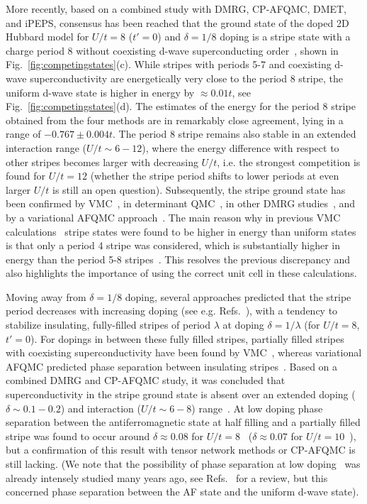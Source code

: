 \documentclass{ar-1col}
\begin{document}
More recently, based on a combined study with DMRG, CP-AFQMC, DMET, and iPEPS, consensus has been reached that the ground state of the doped 2D Hubbard model for $U/t=8$ ($t'=0$) and  $\delta=1/8$ doping is a stripe state with a charge period 8 without coexisting d-wave superconducting order~\cite{Zheng17}, shown in Fig.~\ref{fig:competingstates}(c). While stripes with periods 5-7 and coexisting d-wave superconductivity are energetically very close to the period 8 stripe, the uniform d-wave state is  higher in energy by $\approx 0.01t$, see Fig.~\ref{fig:competingstates}(d). The estimates of the energy for the period 8 stripe obtained from the four methods are in remarkably close agreement, lying in a range of $-0.767\pm0.004 t$. The period 8 stripe remains also stable in an extended interaction range ($U/t\sim6-12$), where the energy difference with respect to other stripes becomes larger with decreasing $U/t$, i.e. the strongest competition is found for $U/t=12$ (whether the stripe period shifts to lower periods at even larger $U/t$ is still an open question). 
Subsequently, the stripe ground state has been confirmed by VMC~\cite{Ido18,Tocchio19}, in determinant QMC~\cite{Huang18},  in other DMRG studies~\cite{Ehlers17,Huang18,Jiang19,Jiang20}, and by a variational AFQMC approach~\cite{Sorella21}.
The main reason why in previous VMC calculations~\cite{Hu12} stripe states were found to be higher in energy than uniform states is that only a period 4 stripe was considered, which is substantially higher in energy than the period 5-8 stripes~\cite{Zheng17,Tocchio19}. This resolves the previous discrepancy and also highlights the importance of using the correct unit cell in these calculations.  


Moving away from $\delta=1/8$ doping, several approaches predicted that the stripe period decreases with increasing doping (see e.g. Refs.~\cite{Darmawan18,Ido18,Tocchio19,Sorella21}), with a tendency to stabilize insulating, fully-filled stripes of period $\lambda$ at doping $\delta=1/\lambda$ (for $U/t=8$, $t'=0$). For dopings in between these fully filled stripes, partially filled stripes with coexisting superconductivity have been found by VMC~\cite{Tocchio19}, whereas variational AFQMC predicted phase separation between insulating stripes~\cite{Sorella21}.  Based on a combined DMRG and CP-AFQMC study, it was concluded that superconductivity in the stripe ground state is absent  over an extended doping ($\delta\sim0.1-0.2$) and interaction ($U/t \sim 6-8$) range~\cite{Qin20}. At  low doping phase separation between the antiferromagnetic state at half filling and a partially filled stripe was found to occur around $\delta\approx 0.08$ for $U/t=8$~\cite{Tocchio19,Sorella21} ($\delta\approx 0.07$ for $U/t=10$~\cite{Darmawan18}), but a confirmation of this result with tensor network methods or CP-AFQMC is still lacking. 
(We note that the possibility of phase separation at low doping~\cite{Emery90} was already intensely studied many years ago, see  Refs.~\cite{Dagotto94,White00} for a review, but this concerned phase separation between the AF state and the uniform d-wave state).
\end{document}
